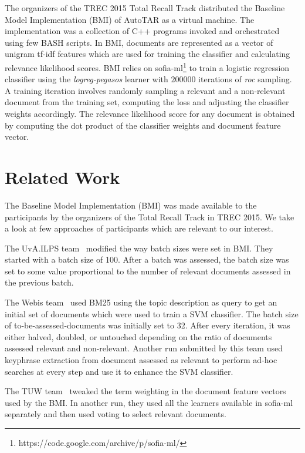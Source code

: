 The organizers of the TREC 2015 Total Recall Track distributed the Baseline
Model Implementation (BMI) of AutoTAR as a virtual machine. The implementation
was a collection of C++ programs invoked and orchestrated using few BASH
scripts.  In BMI, documents are represented as a vector of unigram tf-idf
features which are used for training the classifier and calculating relevance
likelihood scores. BMI relies on
sofia-ml\footnote{https://code.google.com/archive/p/sofia-ml/}
\cite{sculley2010combined} to train a logistic regression classifier using the
\textit{logreg-pegasos} learner with $200000$ iterations of \textit{roc}
sampling. A training iteration involves randomly sampling a relevant and a
non-relevant document from the training set, computing the loss and adjusting
the classifier weights accordingly. The relevance likelihood score for any
document is obtained by computing the dot product of the classifier weights and
document feature vector.

\section{Related Work}

The Baseline Model Implementation (BMI) was made available to the participants
by the organizers of the Total Recall Track in TREC 2015. We take a look at few
approaches of participants which are relevant to our interest.

The UvA.ILPS team~\cite{van2015university} modified the way batch sizes were
set in BMI. They started with a batch size of 100. After a batch was assessed, the
batch size was set to some value proportional to the number of relevant
documents assessed in the previous batch.

The Webis team~\cite{hagen2015webis} used BM25 using the topic description as query to get an
initial set of documents which were used to train a SVM classifier. The batch size of
to-be-assessed-documents was initially set to 32. After every iteration, it was
either halved, doubled, or untouched depending on the ratio of documents
assessed relevant and non-relevant. Another run submitted by this team used
keyphrase extraction from document assessed as relevant to perform ad-hoc
searches at every step and use it to enhance the SVM classifier.

The TUW team~\cite{lupu2015tuw} tweaked the term weighting in the document feature vectors
used by the BMI. In another run, they used all the learners available in
sofia-ml separately and then used voting to select relevant documents.


